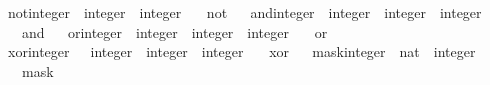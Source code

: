 \begin{isabellebody}
\isanewline
{}\isamarkupfalse%
\ not{\isacharunderscore}{\kern0pt}integer\ {\isacharcolon}{\kern0pt}{\isacharcolon}{\kern0pt}\ {\isacartoucheopen}integer\ {\isasymRightarrow}\ integer{\isacartoucheclose}\isanewline
\ \ \ not%
\isadelimproof
\ %
\endisadelimproof
%
\isatagproof
\isacommand{{\isachardot}{\kern0pt}}\isamarkupfalse%
%
\endisatagproof
{\isafoldproof}%
%
\isadelimproof
%
\endisadelimproof
\isanewline
\isanewline
{}\isamarkupfalse%
\ and{\isacharunderscore}{\kern0pt}integer\ {\isacharcolon}{\kern0pt}{\isacharcolon}{\kern0pt}\ {\isacartoucheopen}integer\ {\isasymRightarrow}\ integer\ {\isasymRightarrow}\ integer{\isacartoucheclose}\isanewline
\ \ \ {\isacartoucheopen}and{\isacartoucheclose}%
\isadelimproof
\ %
\endisadelimproof
%
\isatagproof
\isacommand{{\isachardot}{\kern0pt}}\isamarkupfalse%
%
\endisatagproof
{\isafoldproof}%
%
\isadelimproof
%
\endisadelimproof
\isanewline
\isanewline
{}\isamarkupfalse%
\ or{\isacharunderscore}{\kern0pt}integer\ {\isacharcolon}{\kern0pt}{\isacharcolon}{\kern0pt}\ {\isacartoucheopen}integer\ {\isasymRightarrow}\ integer\ {\isasymRightarrow}\ integer{\isacartoucheclose}\isanewline
\ \ \ or%
\isadelimproof
\ %
\endisadelimproof
%
\isatagproof
\isacommand{{\isachardot}{\kern0pt}}\isamarkupfalse%
%
\endisatagproof
{\isafoldproof}%
%
\isadelimproof
%
\endisadelimproof
\isanewline
\isanewline
{}\isamarkupfalse%
\ xor{\isacharunderscore}{\kern0pt}integer\ {\isacharcolon}{\kern0pt}{\isacharcolon}{\kern0pt}\ \ {\isacartoucheopen}integer\ {\isasymRightarrow}\ integer\ {\isasymRightarrow}\ integer{\isacartoucheclose}\isanewline
\ \ \ xor%
\isadelimproof
\ %
\endisadelimproof
%
\isatagproof
\isacommand{{\isachardot}{\kern0pt}}\isamarkupfalse%
%
\endisatagproof
{\isafoldproof}%
%
\isadelimproof
%
\endisadelimproof
\isanewline
\isanewline
{}\isamarkupfalse%
\ mask{\isacharunderscore}{\kern0pt}integer\ {\isacharcolon}{\kern0pt}{\isacharcolon}{\kern0pt}\ {\isacartoucheopen}nat\ {\isasymRightarrow}\ integer{\isacartoucheclose}\isanewline
\ \ \ mask%
\isadelimproof
\ %
\endisadelimproof
%
\isatagproof
\isacommand{{\isachardot}{\kern0pt}}\isamarkupfalse%
%
\endisatagproof
{\isafoldproof}%
%
\isadelimproof
%
\endisadelimproof
\isanewline
\isanewline
{}\isamarkupfalse%

\end{isabellebody}
